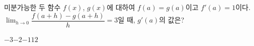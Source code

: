 미분가능한 두 함수 $f(x)$, $g(x)$에 대하여 $f(a)=g(a)$이고 $f'(a)=1$이다. $\displaystyle\lim_{h\to 0}\dfrac{f(a+h)-g(a+h)}{h}=3$일 때, $g'(a)$의 값은?
\begin{choices32}{$-3$}{$-2$}{$-1$}{$1$}{$2$}\end{choices32}

